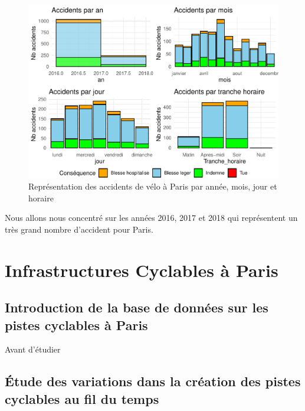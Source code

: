 \documentclass[french,]{compterendu}
\theoremstyle{urcastyle}
\theoremstyle{remark}
\begin{document}
\begin{figure}[H]

{\centering \includegraphics[width=1\linewidth]{Rapport_ADD_LEO-GABET_files/figure-latex/accParisdetail-1} 

}

\caption{Représentation des accidents de vélo à Paris par année, mois, jour et horaire}\label{fig:accParisdetail}
\end{figure}

Nous allons nous concentré sur les années 2016, 2017 et 2018 qui représentent un très grand nombre d'accident pour Paris.

\hypertarget{infrastructures-cyclables-uxe0-paris}{%
\section{Infrastructures Cyclables à Paris}\label{infrastructures-cyclables-uxe0-paris}}

\hypertarget{introduction-de-la-base-de-donnuxe9es-sur-les-pistes-cyclables-uxe0-paris}{%
\subsection{Introduction de la base de données sur les pistes cyclables à Paris}\label{introduction-de-la-base-de-donnuxe9es-sur-les-pistes-cyclables-uxe0-paris}}

Avant d'étudier

\hypertarget{uxe9tude-des-variations-dans-la-cruxe9ation-des-pistes-cyclables-au-fil-du-temps}{%
\subsection{Étude des variations dans la création des pistes cyclables au fil du temps}\label{uxe9tude-des-variations-dans-la-cruxe9ation-des-pistes-cyclables-au-fil-du-temps}}
\end{document}

